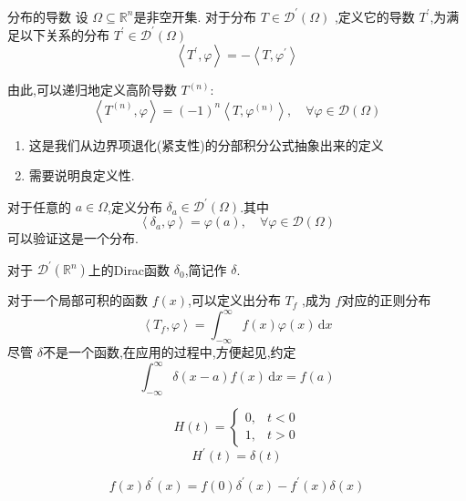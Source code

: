 \documentclass[../../main.tex]{subfiles}
\begin{document}
\begin{definition}{分布的导数}
     设 \(   \Omega \subseteq \mathbb{R} ^{n}  \)是非空开集. 对于分布 \(  T\in \mathcal{D}^{\prime} \left(  \Omega  \right)   \) ,定义它的导数 \(  T^{\prime}   \),为满足以下关系的分布 \(  T^{\prime} \in \mathcal{D}^{\prime} \left(  \Omega  \right)   \) \[
    \left<T^{\prime} , \varphi  \right>= -\left<T, \varphi ^{\prime}  \right>
    \]  

    由此,可以递归地定义高阶导数 \(  T^{\left( n \right) }:   \) \[
    \left<T^{\left( n \right) }, \varphi  \right>=  \left( -1 \right)^{n}\left<T, \varphi ^{\left( n \right) } \right>,\quad \forall  \varphi \in \mathcal{D}\left(  \Omega  \right)  
    \] 
\end{definition}

\begin{remark}
   \begin{enumerate}
    \item 这是我们从边界项退化(紧支性)的分部积分公式抽象出来的定义 
    \item 需要说明良定义性.
   \end{enumerate}
   
\end{remark}


\begin{example}[ Dirac函数 ]
    对于任意的 \(  a \in  \Omega   \),定义分布 \(   \delta _{a}\in \mathcal{D}^{\prime} \left(  \Omega  \right)   \).其中 \[
    \left< \delta _{a}, \varphi  \right>=  \varphi \left( a \right),\quad \forall  \varphi \in \mathcal{D}\left(  \Omega  \right)  
    \]  可以验证这是一个分布.

   对于 \(  \mathcal{D}^{\prime}  \left( \mathbb{R} ^{n} \right)  \)上的Dirac函数 \(   \delta _{0}  \),简记作 \(   \delta   \).   
\end{example}

\begin{example}[ 正则分布 ]
    对于一个局部可积的函数 \(  f\left( x \right)   \),可以定义出分布 \(  T_{f}  \) ,成为 \(  f  \)对应的正则分布  \[
    \left<T_{f}, \varphi  \right>= \int_{-\infty}^{\infty}f\left( x \right) \varphi \left( x \right)\,\mathrm{d} x  
    \] 
    尽管 \(   \delta   \)不是一个函数,在应用的过程中,方便起见,约定 \[
    \int_{-\infty}^{\infty} \delta\left(x-a\right)  f\left( x \right)\,\mathrm{d} x = f\left( a \right) 
    \] 
\end{example}


\begin{example}
    \[
    H\left( t \right)= \begin{cases} 0,&t< 0\\ 
     1,&t> 0 \end{cases}  
    \] \[
    H^{\prime} \left( t \right)=  \delta \left( t \right)  
    \]
\end{example}
\begin{proposition}
    \[
    f\left( x \right) \delta ^{\prime} \left( x \right)= f\left( 0 \right) \delta ^{\prime} \left( x \right) - f^{\prime} \left( x \right) \delta \left( x \right)     
    \]
\end{proposition}
\end{document}
